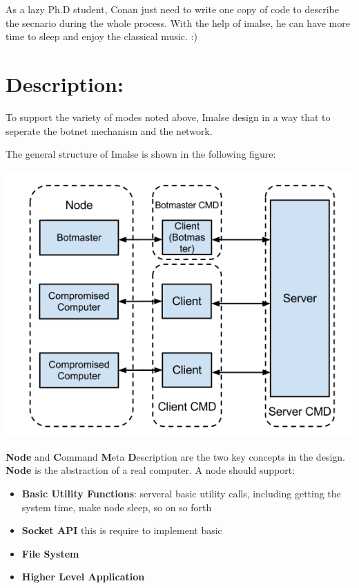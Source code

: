 \documentclass[letterpaper,10pt,english]{sphinxmanual}
\begin{document}
As a lazy Ph.D student, Conan just need to write one copy of code to describe
the secnario during the whole process. With the help of imalse, he can have more
time to sleep and enjoy the classical music. :)


\chapter{Description:}
\label{index:description}
To support the variety of modes noted above, Imalse design in a way that to
seperate the botnet mechanism and the network.

The general structure of Imalse is shown in the following figure:

{\hfill\includegraphics{genearal-structure.png}\hfill}

\textbf{Node} and \textbf{C}ommand \textbf{M}eta \textbf{D}escription are the two key concepts
in the design.  \textbf{Node} is the abstraction of a real computer. A node should
support:
\begin{itemize}
\item {} 
\textbf{Basic Utility Functions}: serveral basic utility calls, including
getting the system time, make node sleep, so on so forth

\item {} 
\textbf{Socket API} this is require to implement basic

\item {} 
\textbf{File System}

\item {} 
\textbf{Higher Level Application}

\end{itemize}
\end{document}
